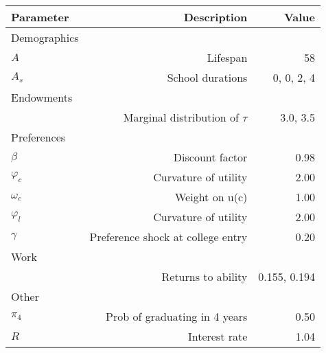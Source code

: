 \begin{tabular}{lrr}
\hline
Parameter & Description  & Value  \\ 
\hline
Demographics &   &   \\ 
$A$ & Lifespan  & 58  \\ 
$A_{s}$ & School durations  & 0, 0, 2, 4  \\ 
Endowments &   &   \\ 
 & Marginal distribution of $\tau$  & 3.0, 3.5  \\ 
Preferences &   &   \\ 
$\beta$ & Discount factor  & 0.98  \\ 
$\varphi_{c}$ & Curvature of utility  & 2.00  \\ 
$\omega_{c}$ & Weight on u(c)  & 1.00  \\ 
$\varphi_{l}$ & Curvature of utility  & 2.00  \\ 
$\gamma$ & Preference shock at college entry  & 0.20  \\ 
Work &   &   \\ 
 & Returns to ability  & 0.155, 0.194  \\ 
Other &   &   \\ 
$\pi_{4}$ & Prob of graduating in 4 years  & 0.50  \\ 
$R$ & Interest rate  & 1.04  \\ 
\hline
\end{tabular}%
